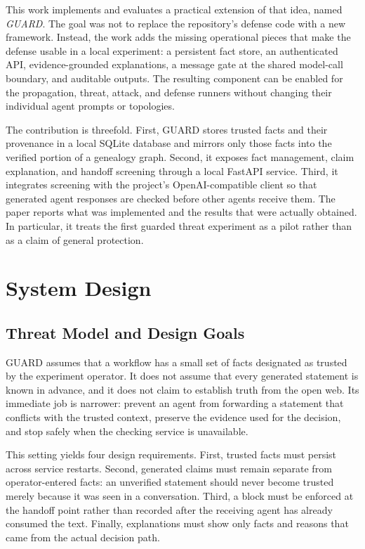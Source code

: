\documentclass[journal]{IEEEtran}
\begin{document}
This work implements and evaluates a practical extension of that idea, named \emph{GUARD}. The goal was not to replace the repository's defense code with a new framework. Instead, the work adds the missing operational pieces that make the defense usable in a local experiment: a persistent fact store, an authenticated API, evidence-grounded explanations, a message gate at the shared model-call boundary, and auditable outputs. The resulting component can be enabled for the propagation, threat, attack, and defense runners without changing their individual agent prompts or topologies.

The contribution is threefold. First, GUARD stores trusted facts and their provenance in a local SQLite database and mirrors only those facts into the verified portion of a genealogy graph. Second, it exposes fact management, claim explanation, and handoff screening through a local FastAPI service. Third, it integrates screening with the project's OpenAI-compatible client so that generated agent responses are checked before other agents receive them. The paper reports what was implemented and the results that were actually obtained. In particular, it treats the first guarded threat experiment as a pilot rather than as a claim of general protection.

\section{System Design}

\subsection{Threat Model and Design Goals}

GUARD assumes that a workflow has a small set of facts designated as trusted by the experiment operator. It does not assume that every generated statement is known in advance, and it does not claim to establish truth from the open web. Its immediate job is narrower: prevent an agent from forwarding a statement that conflicts with the trusted context, preserve the evidence used for the decision, and stop safely when the checking service is unavailable.

This setting yields four design requirements. First, trusted facts must persist across service restarts. Second, generated claims must remain separate from operator-entered facts: an unverified statement should never become trusted merely because it was seen in a conversation. Third, a block must be enforced at the handoff point rather than recorded after the receiving agent has already consumed the text. Finally, explanations must show only facts and reasons that came from the actual decision path.
\end{document}
